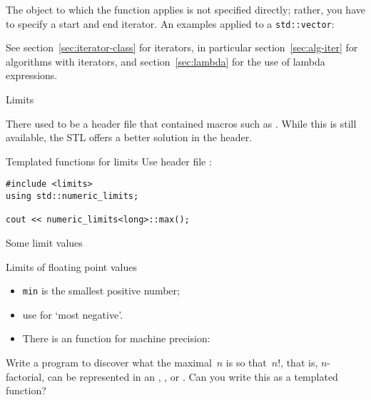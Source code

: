 The object to which the function applies is not specified directly; 
rather, you have to specify a start
and end iterator. An examples applied to a 
\lstinline{std::vector}:
%

See section~\ref{sec:iterator-class} for iterators,
in particular section~\ref{sec:alg-iter} for algorithms with iterators,
and
section~\ref{sec:lambda} for the use of lambda expressions.

 {Limits}
\label{sec:limits}

There used to be a header file  that contained
macros such as . While this is still available,
the \ac{STL} offers a better solution in the
 header.

\begin{block}{Templated functions for limits}
  \label{sl:stl-limits}
  Use header file :
\begin{lstlisting}
#include <limits>
using std::numeric_limits;

cout << numeric_limits<long>::max();
\end{lstlisting}
\end{block}

\begin{block}{Some limit values}
  \label{sl:ieee-limits}
\end{block}

\begin{block}{Limits of floating point values}
  \label{sl:float-limits}
  \begin{itemize}
  \item \lstinline{min} is the smallest positive number;
  \item use  for `most negative'.
  \item There is an  function for machine precision:
  \end{itemize}
\end{block}

\begin{exercise}
  \label{ex:big-factorial}
  Write a program to discover what the maximal~$n$ is so that~$n!$,
  that is, $n$-factorial, can be represented in an , ,
  or . Can you write this as a templated function?
\end{exercise}

